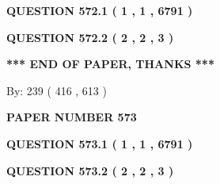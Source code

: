 \documentclass[12pt]{article}
\begin{document}
 
 
 
   
   
  
\vspace{0.2in}
  
{\textbf{\Large{QUESTION
572.1 
 ( 1 , 1 , 6791 )
}}}
  
  
  
\vspace{0.2in}
  
{\textbf{\Large{QUESTION
572.2 
 ( 2 , 2 , 3 )
}}}
  
  
   
   
 \vspace{0.2in}
 
   
   
   
   
\vspace{1.0in} 
{\textbf{\large{ *** END OF PAPER, THANKS *** }}} 
   
   
\hspace{1.0in} By: 
 239 ( 416 ,  613 )
   
   
   
   
\newpage 
\setcounter{page}{ 
   573001 } 
   
   
   
   
 {\textbf{ \Large{ PAPER NUMBER  573  }}}
   
   
\vspace{0.2in}
   
   
   
   
   
   
 \vspace{0.2in}
 
 
 
 
   
   
  
\vspace{0.2in}
  
{\textbf{\Large{QUESTION
573.1 
 ( 1 , 1 , 6791 )
}}}
  
  
  
\vspace{0.2in}
  
{\textbf{\Large{QUESTION
573.2 
 ( 2 , 2 , 3 )
}}}
  
  
   
   
 \vspace{0.2in}
 
   
   
   
   
\end{document}

